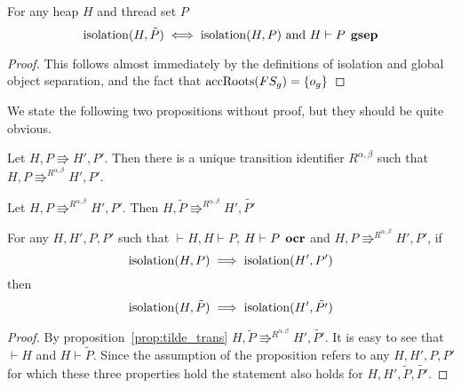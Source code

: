 \begin{proposition} \label{prop:2.8}
  For any heap $H$ and thread set $P$
  \begin{equation*}
    \mbox{$\mathrm{isolation}$}{(H, \tilde{P})} \iff \mbox{$\mathrm{isolation}$}{(H, P)} \text{ and } H \vdash P
    \:\: \mbox{\bf gsep} 
  \end{equation*}
\end{proposition}

\begin{proof}
  This follows almost immediately by the definitions of isolation and global
  object separation, and the fact that $\mbox{$\mathrm{accRoots}$}(FS_g) = \left\{
    o_g \right\}$ 
\end{proof}

We state the following two propositions without proof, but they should be quite
obvious.
\begin{proposition} \label{prop:uniq_trans}
  Let $H, P \Rrightarrow H', P'$. Then there is a unique transition identifier
  $R^{\alpha, \beta}$ such that $H, P \Rrightarrow^{R^{\alpha, \beta}} H', P'$.
\end{proposition}

\begin{proposition} \label{prop:tilde_trans}
  Let $H, P \Rrightarrow^{R^{\alpha, \beta}} H', P'$. Then $H, \tilde{P}
  \Rrightarrow^{R^{\alpha, \beta}} H', \tilde{P'}$
\end{proposition}

\begin{proposition} \label{prop:2.9}
  For any $H, H', P, P'$ such that $\vdash H, H \vdash P$, $H \vdash P \:\:
  \mbox{\bf ocr}$ and $H, P \Rrightarrow^{R^{\alpha, \beta}} H', P'$, if
  \begin{equation*}
      \mbox{$\mathrm{isolation}$}(H, P) 
      \implies 
      \mbox{$\mathrm{isolation}$}(H', P')
  \end{equation*}
  then
  \begin{equation*}
    \mbox{$\mathrm{isolation}$}(H, \tilde{P}) \implies \mbox{$\mathrm{isolation}$}(H', \tilde{P'})
  \end{equation*}
\end{proposition}

\begin{proof}
  By proposition~\ref{prop:tilde_trans} $H, \tilde{P} \Rrightarrow^{R^{\alpha,
  \beta}} H', \tilde{P'}$. It is easy to see that $\vdash H$ and $H \vdash
  \tilde{P}$.
  Since the assumption of the proposition refers to any $H, H', P, P'$ for which
  these three properties hold the statement also holds for $H, H',
  \tilde{P}, \tilde{P'}$.
\end{proof}


